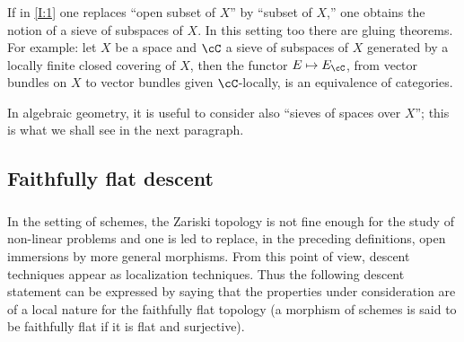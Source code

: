 \subsubsection{}\label{I:1-3-4}

If in \ref{I:1} one replaces ``open subset of $X$'' by ``subset of
$X$,'' one obtains the notion of a sieve of subspaces of $X$. In this setting
too there are gluing theorems. For example: let $X$ be a
space and $\cC$ a sieve of subspaces of $X$ generated by a locally finite
closed covering of $X$, then the functor $E\mapsto E_\cC$, from vector
bundles on $X$ to vector bundles given $\cC$-locally, is an
equivalence of categories.

In algebraic geometry, it is useful to consider also ``sieves
of spaces over $X$''; this is what we shall see in the next paragraph. 










\subsection{Faithfully flat descent}\label{I:1-4}





\subsubsection{}\label{I:1-4-1}

In the setting of schemes, the Zariski topology is not fine enough for
the study of non-linear problems and one is led to replace, in the
preceding definitions, open immersions by more
general morphisms. From this point of view, descent techniques appear as
localization techniques. Thus the following descent statement can be expressed
by saying that the properties under consideration are of a local nature for the
faithfully flat topology (a morphism of schemes is said to be faithfully
flat if it is flat and surjective). 


